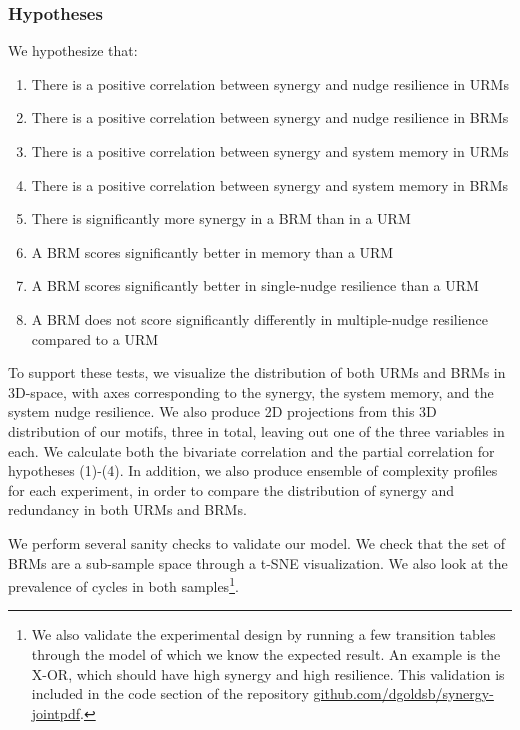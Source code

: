 \documentclass[../main.tex]{subfiles}
\begin{document}
\subsubsection{Hypotheses}

We hypothesize that:

\begin{enumerate}
\itemsep0em
\item There is a positive correlation between synergy and nudge resilience in URMs
\item There is a positive correlation between synergy and nudge resilience in BRMs
\item There is a positive correlation between synergy and system memory in URMs
\item There is a positive correlation between synergy and system memory in BRMs
\item There is significantly more synergy in a BRM than in a URM
\item A BRM scores significantly better in memory than a URM
\item A BRM scores significantly better in single-nudge resilience than a URM
\item A BRM does not score significantly differently in multiple-nudge resilience compared to a URM
\end{enumerate}

To support these tests, we visualize the distribution of both URMs and BRMs in 3D-space, with axes corresponding to the synergy, the system memory, and the system nudge resilience.
We also produce 2D projections from this 3D distribution of our motifs, three in total, leaving out one of the three variables in each.
We calculate both the bivariate correlation and the partial correlation for hypotheses (1)-(4).
In addition, we also produce ensemble of complexity profiles for each experiment, in order to compare the distribution of synergy and redundancy in both URMs and BRMs.

We perform several sanity checks to validate our model.
We check that the set of BRMs are a sub-sample space through a t-SNE visualization.
We also look at the prevalence of cycles in both samples\footnote{We also validate the experimental design by running a few transition tables through the model of which we know the expected result. An example is the X-OR, which should have high synergy and high resilience. This validation is included in the code section of the repository \url{github.com/dgoldsb/synergy-jointpdf}.}.
\end{document}
